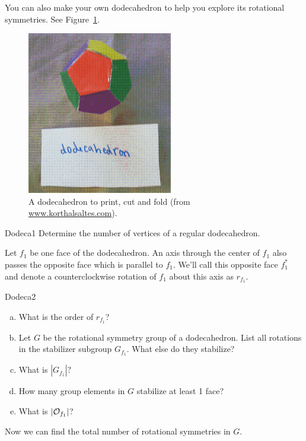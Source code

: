 You can also make your own dodecahedron to help you explore its rotational symmetries. See Figure~\ref{fig:DodecaFold}.

\begin{figure}[ht]
\begin{center}
\includegraphics[width=2.5in]{images/DodecahedronFold.png}
\caption{ \label{fig:DodecaFold}A dodecahedron to print, cut and fold  (from  \url{www.korthalsaltes.com}).}

\end{center}
\end{figure}

\begin{exercise}{Dodeca1}
Determine the number of vertices of a regular dodecahedron.
\end{exercise}
Let $f_1$ be one face of the dodecahedron.  An axis through the center of $f_1$ also passes the opposite face which is parallel to $f_1$. We'll call this opposite face $f_1^*$ and denote a counterclockwise rotation of $f_1$ about this axis as $r_{f_1}$.

\begin{exercise}{Dodeca2}
\begin{enumerate}[(a)]
\item What is the order of $r_{f_1}$?
\item Let $G$ be the rotational symmetry group of a dodecahedron.  List all rotations in the stabilizer subgroup $G_{f_1}$.  What else do they stabilize?
\item What is $|G_{f_1}|?$
\item How many group elements in $G$ stabilize at least 1 face?
\item What is $|{\cal O}_{f_1}|$?
\end{enumerate}
\end{exercise}
Now we can find the total number of rotational symmetries in $G$.

